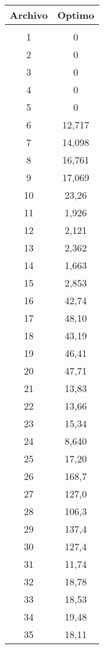 \begin{figure}[h]
    \centering
    \begin{minipage}[l]{0.32\textwidth}
	    \begin{tabular}{|c|c|}
	        \hline
	        \textbf{Archivo} & \textbf{Optimo} \\
	        \hline
	        &\\
	        1 & 0\\
            2 & 0\\
            3 & 0\\
            4 & 0\\
            5 & 0\\
            6 & 12,717\\
            7 & 14,098\\
            8 & 16,761\\
            9 & 17,069\\
            10 & 23,26\\
            11 & 1,926\\
            12 & 2,121\\
            13 & 2,362\\
            14 & 1,663\\
            15 & 2,853\\
            16 & 42,74\\
            17 & 48,10\\
            18 & 43,19\\
            19 & 46,41\\
            20 & 47,71\\
            21 & 13,83\\
            22 & 13,66\\
            23 & 15,34\\
            24 & 8,640\\
            25 & 17,20\\
            26 & 168,7\\
            27 & 127,0\\
            28 & 106,3\\
            29 & 137,4\\
            30 & 127,4\\
            31 & 11,74\\
            32 & 18,78\\
            33 & 18,53\\
            34 & 19,48\\
            35 & 18,11\\

\end{tabular}
\end{minipage}
\end{figure}
